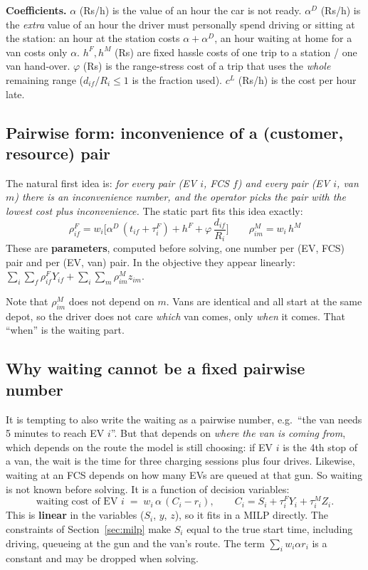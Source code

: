 \documentclass[11pt,a4paper]{article}
\begin{document}
\textbf{Coefficients.}
$\alpha$ (Rs/h) is the value of an hour the car is not ready.
$\alpha^D$ (Rs/h) is the \emph{extra} value of an hour the driver must personally spend driving or sitting at the station: an hour at the station costs $\alpha+\alpha^D$, an hour waiting at home for a van costs only $\alpha$.
$h^F,h^M$ (Rs) are fixed hassle costs of one trip to a station / one van hand-over.
$\varphi$ (Rs) is the range-stress cost of a trip that uses the \emph{whole} remaining range ($d_{if}/R_i\le1$ is the fraction used).
$c^L$ (Rs/h) is the cost per hour late.

\subsection{Pairwise form: inconvenience of a (customer, resource) pair}

The natural first idea is: \emph{for every pair (EV $i$, FCS $f$) and every pair (EV $i$, van $m$) there is an inconvenience number, and the operator picks the pair with the lowest cost plus inconvenience.} The static part fits this idea exactly:
\[
\boxed{\;\rho^F_{if}=w_i\Big[\alpha^D\,(t_{if}+\tau^F_i)+h^F+\varphi\,\frac{d_{if}}{R_i}\Big]\qquad
\rho^M_{im}=w_i\,h^M\;}
\]
These are \textbf{parameters}, computed before solving, one number per (EV, FCS) pair and per (EV, van) pair. In the objective they appear linearly: $\sum_i\sum_f\rho^F_{if}Y_{if}+\sum_i\sum_m\rho^M_{im}z_{im}$.

Note that $\rho^M_{im}$ does not depend on $m$. Vans are identical and all start at the same depot, so the driver does not care \emph{which} van comes, only \emph{when} it comes. That ``when'' is the waiting part.

\subsection{Why waiting cannot be a fixed pairwise number}

It is tempting to also write the waiting as a pairwise number, e.g.\ ``the van needs 5 minutes to reach EV $i$''. But that depends on \emph{where the van is coming from}, which depends on the route the model is still choosing: if EV $i$ is the 4th stop of a van, the wait is the time for three charging sessions plus four drives. Likewise, waiting at an FCS depends on how many EVs are queued at that gun. So waiting is not known before solving. It is a function of decision variables:
\[
\text{waiting cost of EV } i \;=\; w_i\,\alpha\,(C_i-r_i),\qquad C_i=S_i+\tau^F_iY_i+\tau^M_iZ_i .
\]
This is \textbf{linear} in the variables ($S_i$, $y$, $z$), so it fits in a MILP directly. The constraints of Section~\ref{sec:milp} make $S_i$ equal to the true start time, including driving, queueing at the gun and the van's route. The term $\sum_i w_i\alpha r_i$ is a constant and may be dropped when solving.
\end{document}
